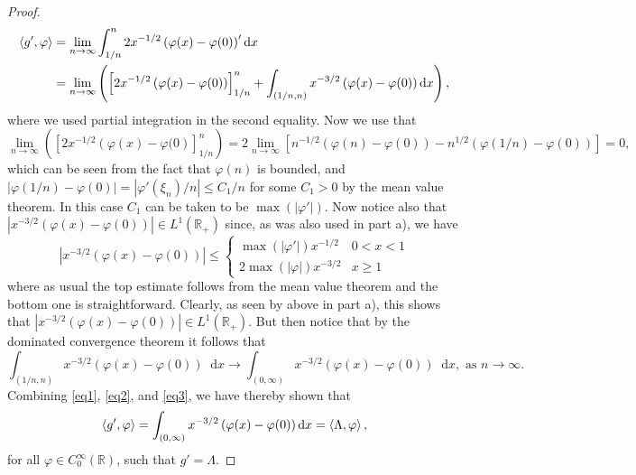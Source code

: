 \documentclass[a4paper,11pt]{article}
\newcommand{\abs}[1]{\left\lvert #1 \right\rvert}
\newcommand*\diff{\mathop{}\!\mathrm{d}}
\newcommand{\R}{\mathbb{R}}
\numberwithin{equation}{section}
\begin{document}
\begin{proof}
\begin{equation}\label{eq1}
\begin{aligned}
\braket{g',\varphi}&=\lim\limits_{n\to\infty}\int_{1/n}^{n} 2x^{-1/2}\left(\varphi(x)-\varphi(0)\right)'\diff x\\&=\lim\limits_{n\to\infty}\left(\left[2x^{-1/2}\left(\varphi(x)-\varphi(0)\right)\right]_{1/n}^{n}+\int_{(1/n,n)} x^{-3/2}\left(\varphi(x)-\varphi(0)\right)\diff x\right),
\end{aligned}
\end{equation}
where we used partial integration in the second equality.
Now we use that \begin{equation}
\label{eq2}
\lim\limits_{n\to\infty}\left(\left[2x^{-1/2}\left(\varphi(x)-\varphi(0\right)\right]_{1/n}^{n}\right)=2\lim\limits_{n\to\infty}\left[n^{-1/2}(\varphi(n)-\varphi(0))-n^{1/2}(\varphi(1/n)-\varphi(0))\right]=0,
\end{equation}
which can be seen from the fact that $ \varphi(n) $ is bounded, and $ \abs{\varphi(1/n)-\varphi(0)}=\abs{\varphi'(\xi_n)/n}\leq C_1/n $ for some $ C_1>0 $ by the mean value theorem. In this case $ C_1 $ can be taken to be $ \max(\abs{\varphi'}) $. Now notice also that $  \abs{x^{-3/2}\left(\varphi(x)-\varphi(0)\right)}\in L^1(\R_+) $ since, as was also used in part a), we have \begin{equation}
\abs{x^{-3/2}\left(\varphi(x)-\varphi(0)\right)}\leq\begin{cases}
\max(\abs{\varphi'})x^{-1/2}&0<x<1\\
2\max(\abs{\varphi})x^{-3/2} & x\geq 1
\end{cases}
\end{equation} where as usual the top estimate follows from the mean value theorem and the bottom one is straightforward. Clearly, as seen by above in part a), this shows that $ \abs{x^{-3/2}\left(\varphi(x)-\varphi(0)\right)}\in L^1(\R_+) $. But then notice that by the dominated convergence theorem it follows that \begin{equation}\label{eq3}
\int_{(1/n,n)} x^{-3/2}\left(\varphi(x)-\varphi(0)\right)\diff x\to\int_{(0,\infty)} x^{-3/2}\left(\varphi(x)-\varphi(0)\right)\diff x,\text{ as }n\to\infty.
\end{equation}
Combining \eqref{eq1}, \eqref{eq2}, and \eqref{eq3}, we have thereby shown that \begin{equation}
\braket{g',\varphi}=\int_{(0,\infty)} x^{-3/2}\left(\varphi(x)-\varphi(0)\right)\diff x=\braket{\Lambda,\varphi}, 
\end{equation} 
for all $ \varphi\in C^\infty_0(\R)$,
such that $ g'=\Lambda $.
\end{proof}
\end{document}
